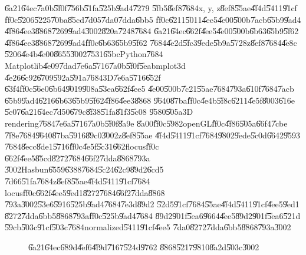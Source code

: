 \documentclass[12pt,a4paper]{article}
\begin{document}
\U{6a21}\U{64ec}\U{7a0b}\U{5f0f}\U{756b}\U{51fa}\U{525b}\U{9ad4}\U{7279}%
\U{5fb5}\U{8ef8}\U{7684}x, y, z\U{8ef8}\U{55ae}\U{4f4d}\U{5411}\U{91cf}%
\U{ff0c}\U{5206}\U{5225}\U{70ba}\U{85cd}\U{7d05}\U{7da0}\U{7dda}\U{6bb5}%
\U{ff0c}\U{6211}\U{5011}\U{4ee5}\U{4e00}\U{500b}\U{7acb}\U{65b9}\U{9ad4}%
\U{4f86}\U{4ee3}\U{8868}\U{7269}\U{9ad4}\U{3002}\U{820a}\U{7248}\U{7684}%
\U{6a21}\U{64ec}\U{662f}\U{4ee5}\U{4e00}\U{500b}\U{6b63}\U{65b9}\U{5f62}%
\U{4f86}\U{4ee3}\U{8868}\U{7269}\U{9ad4}\U{ff0c}\U{6b63}\U{65b9}\U{5f62}%
\U{7684}\U{4e2d}\U{5fc3}\U{9ede}\U{5b9a}\U{5728}z\U{8ef8}\U{7684}\U{4e8c}%
\U{5206}\U{4e4b}\U{4e00}\U{8655}\U{3002}\U{7531}\U{65bc}Python\U{7684}%
Matplotlib\U{4e09}\U{7dad}\U{7e6a}\U{5716}\U{7a0b}\U{5f0f}\U{5eab}mplot3d%
\U{4e26}\U{6c92}\U{6709}\U{592a}\U{591a}\U{7684}3D\U{7e6a}\U{5716}\U{652f}%
\U{63f4}\U{ff0c}\U{56e0}\U{6b64}\U{9019}\U{908a}\U{53ea}\U{662f}\U{4ee5}%
\U{4e00}\U{500b}\U{7c21}\U{55ae}\U{7684}\U{793a}\U{610f}\U{7684}\U{7acb}%
\U{65b9}\U{9ad4}\U{6216}\U{6b63}\U{65b9}\U{5f62}\U{4f86}\U{4ee3}\U{8868}%
\U{9640}\U{87ba}\U{ff0c}\U{4e4b}\U{5f8c}\U{6211}\U{4e5f}\U{8003}\U{616e}%
\U{5c07}\U{6a21}\U{64ec}\U{7d50}\U{679c}\U{8f38}\U{51fa}\U{81f3}\U{5c08}%
\U{9580}\U{505a}3D rendering\U{7684}\U{7e6a}\U{5716}\U{7a0b}\U{5f0f}\U{8a9e}%
\U{8a00}\U{ff0c}\U{5982}openGL\U{ff0c}\U{4f86}\U{505a}\U{66f4}\U{7cbe}%
\U{7f8e}\U{7684}\U{9640}\U{87ba}\U{5916}\U{89c0}\U{3002}z\U{8ef8}\U{55ae}%
\U{4f4d}\U{5411}\U{91cf}\U{7684}\U{9802}\U{9ede}\U{5c0d}\U{6642}\U{9593}%
\U{7684}\U{8ecc}\U{8de1}\U{5716}\U{ff0c}\U{4e5f}\U{5c31}\U{662f}locus\U{ff0c}%
\U{662f}\U{4ee5}\U{85cd}\U{8272}\U{7684}\U{66f2}\U{7dda}\U{8868}\U{793a}%
\U{3002}Hasbun\U{6559}\U{6388}\U{7684}\U{5c24}\U{62c9}\U{89d2}\U{6cd5}%
\U{7d66}\U{51fa}\U{7684}z\U{8ef8}\U{55ae}\U{4f4d}\U{5411}\U{91cf}\U{7684}%
locus\U{ff0c}\U{662f}\U{4ee5}\U{9ed1}\U{8272}\U{7684}\U{66f2}\U{7dda}\U{8868}%
\U{793a}\U{3002}\U{53e6}\U{5916}\U{525b}\U{9ad4}\U{7684}\U{7e3d}\U{89d2}%
\U{52d5}\U{91cf}\U{7684}\U{55ae}\U{4f4d}\U{5411}\U{91cf}\U{4ee5}\U{9ed1}%
\U{8272}\U{7dda}\U{6bb5}\U{8868}\U{793a}\U{ff0c}\U{525b}\U{9ad4}\U{7684}%
\U{89d2}\U{901f}\U{5ea6}\U{9664}\U{4ee5}\U{89d2}\U{901f}\U{5ea6}\U{521d}%
\U{59cb}\U{503c}\U{91cf}\U{503c}\U{7684}normalized\U{5411}\U{91cf}\U{4ee5}%
\U{7da0}\U{8272}\U{7dda}\U{6bb5}\U{8868}\U{793a}\U{3002}

\begin{figure}[th]
\caption{\U{6a21}\U{64ec}\U{689d}\U{4ef6}\U{4f9d}\U{7167}\U{524d}\U{9762}%
\U{8868}\U{5217}\U{9810}\U{8a2d}\U{503c}\U{3002}}
\begin{center}
\fbox{}
\end{center}
\end{figure}
\end{document}
